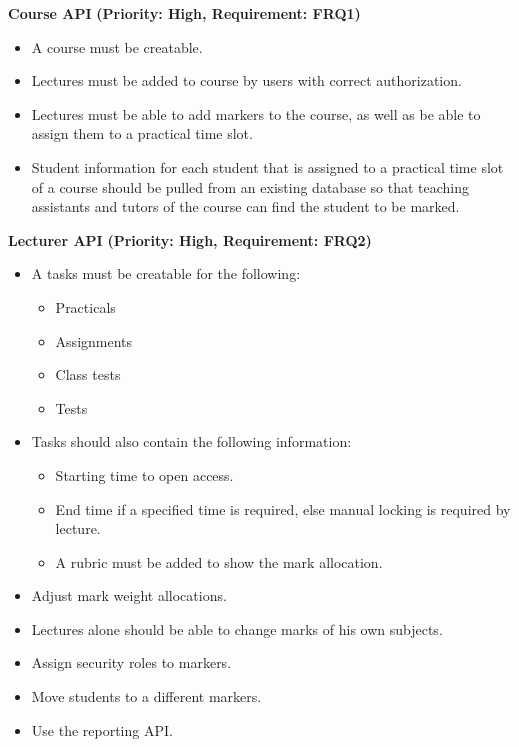 \documentclass[12pt]{article}
\begin{document}
			\begin{flushleft}
				\textbf{Course API}
				\newline\textbf{(Priority: High, Requirement: FRQ1)}
			\end{flushleft}
			
			\vspace{0.02in}
			
				\begin{itemize}
					\item A course must be creatable.
					\item Lectures must be added to course by users with correct authorization.
					\item Lectures must be able to add markers to the course, as well as be able to assign them to a practical time slot.
					\item Student information for each student that is assigned to a practical time slot of a course should be pulled from an existing database so that teaching assistants and tutors of the course can find the student to be marked.
				\end{itemize}
				
			\vspace{0.15in}
				
			\begin{flushleft}
				\textbf{Lecturer API}
				\newline\textbf{(Priority: High, Requirement: FRQ2)}
			\end{flushleft}
						
			\vspace{0.02in}
			
			\begin{itemize}
				\item A tasks must be creatable for the following:
						\begin{itemize}
							\item Practicals
							\item Assignments
							\item Class tests
							\item Tests
						\end{itemize}
				\item Tasks should also contain the following information:
						\begin{itemize}
							\item Starting time to open access.
							\item End time if a specified time is required, else manual locking is required by lecture.
							\item A rubric must be added to show the mark allocation.
						\end{itemize}
				\item Adjust mark weight allocations.
				\item Lectures alone should be able to change marks of his own subjects.
				\item Assign security roles to markers.
				\item Move students to a different markers.
				\item Use the reporting API.
			\end{itemize}
				
\end{document}
